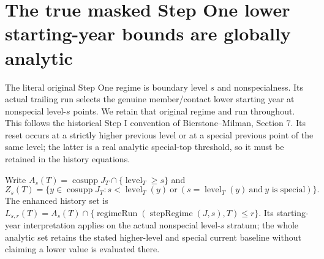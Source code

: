 \section{The true masked Step One lower starting-year bounds are globally analytic}

The literal original Step One regime is boundary level $s$ and nonspecialness.
Its actual trailing run selects the genuine member/contact lower starting year
at nonspecial level-$s$ points. We retain that original regime and run throughout.
This follows the historical Step I convention of Bierstone--Milman\cite{bierstone-milman08-functoriality},
Section 7. Its reset occurs at a strictly higher previous level or at a special
previous point of the same level; the latter is a real analytic special-top
threshold, so it must be retained in the history equations.

Write $A_s(T)=\operatorname{cosupp}J_T\cap\{\operatorname{level}_T\ge s\}$ and
\[
 Z_s(T)=\{y\in\operatorname{cosupp}J_T:
   s<\operatorname{level}_T(y)\ \text{or}\
   (s=\operatorname{level}_T(y)\ \text{and}\ y\text{ is special})\}.
\]
The enhanced history set is
$L_{s,r}(T)=A_s(T)\cap\{\operatorname{regimeRun}(\operatorname{stepRegime}(J,s),T)\le r\}$.
Its starting-year interpretation applies on the actual nonspecial level-$s$
stratum; the whole analytic set retains the stated higher-level and special
current baseline without claiming a lower value is evaluated there.

